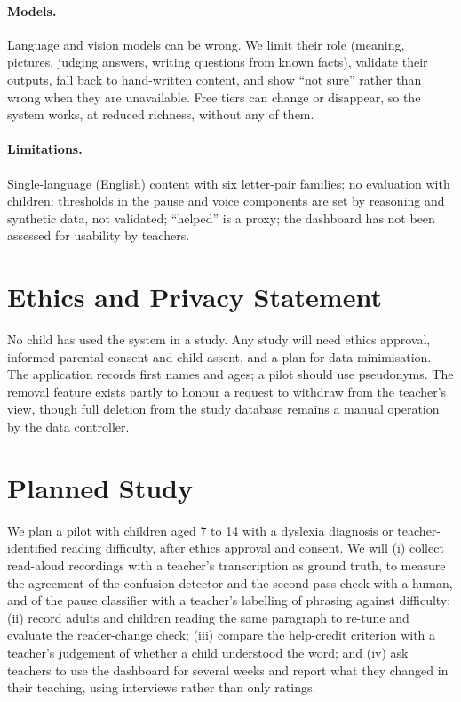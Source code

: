 \documentclass[manuscript, screen, review, anonymous]{acmart}
\begin{document}
\paragraph{Models.} Language and vision models can be wrong. We limit their role (meaning, pictures, judging answers, writing questions from known facts), validate their outputs, fall back to hand-written content, and show ``not sure'' rather than wrong when they are unavailable. Free tiers can change or disappear, so the system works, at reduced richness, without any of them.

\paragraph{Limitations.} Single-language (English) content with six letter-pair families; no evaluation with children; thresholds in the pause and voice components are set by reasoning and synthetic data, not validated; ``helped'' is a proxy; the dashboard has not been assessed for usability by teachers.

\section{Ethics and Privacy Statement}
No child has used the system in a study. Any study will need ethics approval, informed parental consent and child assent, and a plan for data minimisation. The application records first names and ages; a pilot should use pseudonyms. The removal feature exists partly to honour a request to withdraw from the teacher's view, though full deletion from the study database remains a manual operation by the data controller.

\section{Planned Study}
We plan a pilot with children aged 7 to 14 with a dyslexia diagnosis or teacher-identified reading difficulty, after ethics approval and consent. We will (i) collect read-aloud recordings with a teacher's transcription as ground truth, to measure the agreement of the confusion detector and the second-pass check with a human, and of the pause classifier with a teacher's labelling of phrasing against difficulty; (ii) record adults and children reading the same paragraph to re-tune and evaluate the reader-change check; (iii) compare the help-credit criterion with a teacher's judgement of whether a child understood the word; and (iv) ask teachers to use the dashboard for several weeks and report what they changed in their teaching, using interviews rather than only ratings.
\end{document}
